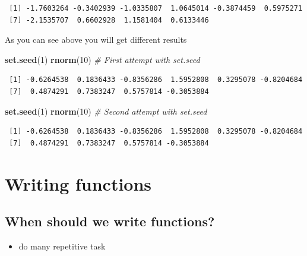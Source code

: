 \documentclass[]{book}
\newenvironment{Shaded}{\begin{snugshade}}{\end{snugshade}}
\newcommand{\CommentTok}[1]{\textcolor[rgb]{0.56,0.35,0.01}{\textit{#1}}}
\newcommand{\DecValTok}[1]{\textcolor[rgb]{0.00,0.00,0.81}{#1}}
\newcommand{\KeywordTok}[1]{\textcolor[rgb]{0.13,0.29,0.53}{\textbf{#1}}}
\newcommand{\NormalTok}[1]{#1}
\providecommand{\tightlist}{%
  \setlength{\itemsep}{0pt}\setlength{\parskip}{0pt}}
\begin{document}
\begin{verbatim}
 [1] -1.7603264 -0.3402939 -1.0335807  1.0645014 -0.3874459  0.5975271
 [7] -2.1535707  0.6602928  1.1581404  0.6133446
\end{verbatim}

As you can see above you will get different results

\begin{Shaded}
\begin{Highlighting}[]
\KeywordTok{set.seed}\NormalTok{(}\DecValTok{1}\NormalTok{)}
\KeywordTok{rnorm}\NormalTok{(}\DecValTok{10}\NormalTok{) }\CommentTok{# First attempt with set.seed}
\end{Highlighting}
\end{Shaded}

\begin{verbatim}
 [1] -0.6264538  0.1836433 -0.8356286  1.5952808  0.3295078 -0.8204684
 [7]  0.4874291  0.7383247  0.5757814 -0.3053884
\end{verbatim}

\begin{Shaded}
\begin{Highlighting}[]
\KeywordTok{set.seed}\NormalTok{(}\DecValTok{1}\NormalTok{)}
\KeywordTok{rnorm}\NormalTok{(}\DecValTok{10}\NormalTok{) }\CommentTok{# Second attempt with set.seed}
\end{Highlighting}
\end{Shaded}

\begin{verbatim}
 [1] -0.6264538  0.1836433 -0.8356286  1.5952808  0.3295078 -0.8204684
 [7]  0.4874291  0.7383247  0.5757814 -0.3053884
\end{verbatim}

\hypertarget{writing-functions}{%
\chapter{Writing functions}\label{writing-functions}}

\hypertarget{when-should-we-write-functions}{%
\section{When should we write functions?}\label{when-should-we-write-functions}}

\begin{itemize}
\tightlist
\item
  do many repetitive task
\end{itemize}
\end{document}
